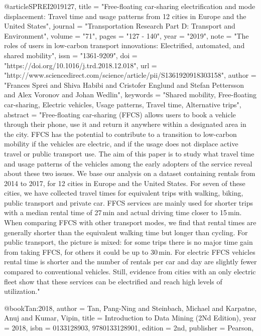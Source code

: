 


@article{SPREI2019127,
title = "Free-floating car-sharing electrification and mode displacement: Travel time and usage patterns from 12 cities in Europe and the United States",
journal = "Transportation Research Part D: Transport and Environment",
volume = "71",
pages = "127 - 140",
year = "2019",
note = "The roles of users in low-carbon transport innovations: Electrified, automated, and shared mobility",
issn = "1361-9209",
doi = "https://doi.org/10.1016/j.trd.2018.12.018",
url = "http://www.sciencedirect.com/science/article/pii/S1361920918303158",
author = "Frances Sprei and Shiva Habibi and Cristofer Englund and Stefan Pettersson and Alex Voronov and Johan Wedlin",
keywords = "Shared mobility, Free-floating car-sharing, Electric vehicles, Usage patterns, Travel time, Alternative trips",
abstract = "Free-floating car-sharing (FFCS) allows users to book a vehicle through their phone, use it and return it anywhere within a designated area in the city. FFCS has the potential to contribute to a transition to low-carbon mobility if the vehicles are electric, and if the usage does not displace active travel or public transport use. The aim of this paper is to study what travel time and usage patterns of the vehicles among the early adopters of the service reveal about these two issues. We base our analysis on a dataset containing rentals from 2014 to 2017, for 12 cities in Europe and the United States. For seven of these cities, we have collected travel times for equivalent trips with walking, biking, public transport and private car. FFCS services are mainly used for shorter trips with a median rental time of 27 min and actual driving time closer to 15 min. When comparing FFCS with other transport modes, we find that rental times are generally shorter than the equivalent walking time but longer than cycling. For public transport, the picture is mixed: for some trips there is no major time gain from taking FFCS, for others it could be up to 30 min. For electric FFCS vehicles rental time is shorter and the number of rentals per car and day are slightly fewer compared to conventional vehicles. Still, evidence from cities with an only electric fleet show that these services can be electrified and reach high levels of utilization."
}









@book{Tan:2018,
 author = {Tan, Pang-Ning and Steinbach, Michael and Karpatne, Anuj and Kumar, Vipin},
 title = {Introduction to Data Mining (2Nd Edition)},
 year = {2018},
 isbn = {0133128903, 9780133128901},
 edition = {2nd},
 publisher = {Pearson},
}

